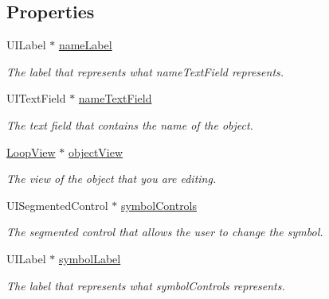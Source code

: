 \subsection*{Properties}
\begin{DoxyCompactItemize}
\item 
\hypertarget{interface_loop_edit_menu_view_af91fc4ee7ce5ce8ac3b0f00e38824b04}{U\-I\-Label $\ast$ \hyperlink{interface_loop_edit_menu_view_af91fc4ee7ce5ce8ac3b0f00e38824b04}{name\-Label}}\label{interface_loop_edit_menu_view_af91fc4ee7ce5ce8ac3b0f00e38824b04}

\begin{DoxyCompactList}\small\item\em The label that represents what name\-Text\-Field represents. \end{DoxyCompactList}\item 
\hypertarget{interface_loop_edit_menu_view_a5cbc9eaf5c10f7b61fa933746ae0bb6e}{U\-I\-Text\-Field $\ast$ \hyperlink{interface_loop_edit_menu_view_a5cbc9eaf5c10f7b61fa933746ae0bb6e}{name\-Text\-Field}}\label{interface_loop_edit_menu_view_a5cbc9eaf5c10f7b61fa933746ae0bb6e}

\begin{DoxyCompactList}\small\item\em The text field that contains the name of the object. \end{DoxyCompactList}\item 
\hypertarget{interface_loop_edit_menu_view_a6fdbff14250b254546c94f76fc96d7d6}{\hyperlink{interface_loop_view}{Loop\-View} $\ast$ \hyperlink{interface_loop_edit_menu_view_a6fdbff14250b254546c94f76fc96d7d6}{object\-View}}\label{interface_loop_edit_menu_view_a6fdbff14250b254546c94f76fc96d7d6}

\begin{DoxyCompactList}\small\item\em The view of the object that you are editing. \end{DoxyCompactList}\item 
\hypertarget{interface_loop_edit_menu_view_aef6c133a316fec6f579fc8f5c041d83e}{U\-I\-Segmented\-Control $\ast$ \hyperlink{interface_loop_edit_menu_view_aef6c133a316fec6f579fc8f5c041d83e}{symbol\-Controls}}\label{interface_loop_edit_menu_view_aef6c133a316fec6f579fc8f5c041d83e}

\begin{DoxyCompactList}\small\item\em The segmented control that allows the user to change the symbol. \end{DoxyCompactList}\item 
\hypertarget{interface_loop_edit_menu_view_a9c70b5765d0c00ae39e54c929356d7f6}{U\-I\-Label $\ast$ \hyperlink{interface_loop_edit_menu_view_a9c70b5765d0c00ae39e54c929356d7f6}{symbol\-Label}}\label{interface_loop_edit_menu_view_a9c70b5765d0c00ae39e54c929356d7f6}

\begin{DoxyCompactList}\small\item\em The label that represents what symbol\-Controls represents. \end{DoxyCompactList}\end{DoxyCompactItemize}



